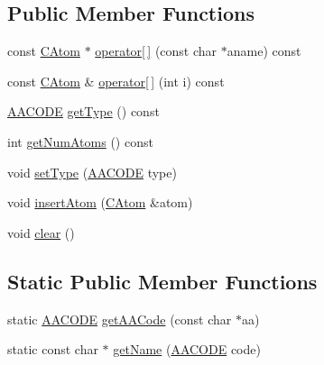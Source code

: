 \subsection*{Public Member Functions}
\begin{DoxyCompactItemize}
\item 
const \hyperlink{classCAtom}{C\-Atom} $\ast$ \hyperlink{classAA_aa271a8269c3a69c795651b87768abd3c}{operator\mbox{[}$\,$\mbox{]}} (const char $\ast$aname) const 
\item 
const \hyperlink{classCAtom}{C\-Atom} \& \hyperlink{classAA_ad47e1014c42578100eb951d057130d60}{operator\mbox{[}$\,$\mbox{]}} (int i) const 
\item 
\hyperlink{classAA_a8717db02e7eeaac316898736843fa600}{A\-A\-C\-O\-D\-E} \hyperlink{classAA_a7bb2b102b435f41fa3c78c1cded8ce93}{get\-Type} () const 
\item 
int \hyperlink{classAA_a296b621ecb2dc785e0c27614dab7df37}{get\-Num\-Atoms} () const 
\item 
void \hyperlink{classAA_a111b14b73321f7fbd0e910fe7377d3e2}{set\-Type} (\hyperlink{classAA_a8717db02e7eeaac316898736843fa600}{A\-A\-C\-O\-D\-E} type)
\item 
void \hyperlink{classAA_ae0851c13f0b0aee431c4b90a17a58c7a}{insert\-Atom} (\hyperlink{classCAtom}{C\-Atom} \&atom)
\item 
void \hyperlink{classAA_a77290c917ac630708465bb700c9a1d91}{clear} ()
\end{DoxyCompactItemize}
\subsection*{Static Public Member Functions}
\begin{DoxyCompactItemize}
\item 
static \hyperlink{classAA_a8717db02e7eeaac316898736843fa600}{A\-A\-C\-O\-D\-E} \hyperlink{classAA_a4586e72f7a09f932e29188a5098f124f}{get\-A\-A\-Code} (const char $\ast$aa)
\item 
static const char $\ast$ \hyperlink{classAA_a1ae2a562a71d05aa8c1f9b3c7136e3b7}{get\-Name} (\hyperlink{classAA_a8717db02e7eeaac316898736843fa600}{A\-A\-C\-O\-D\-E} code)
\end{DoxyCompactItemize}
